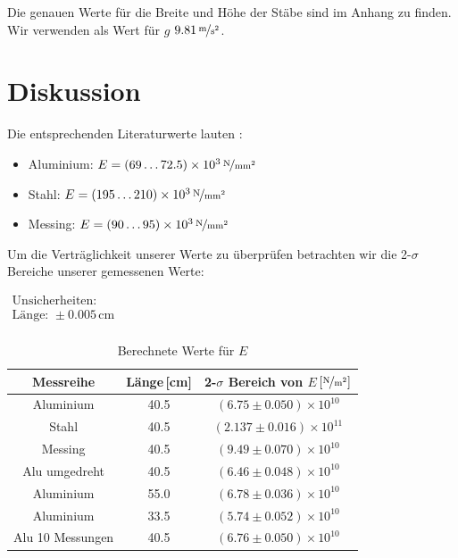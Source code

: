 \documentclass[11pt,a4paper]{article}
\begin{document}
Die genauen Werte f\"ur die Breite und H\"ohe der St\"abe sind im Anhang zu finden. Wir verwenden als Wert f\"ur $g$ $9.81\,\nicefrac{\mathrm{m}}{\mathrm{s}^2}$.

\pagebreak

\section{Diskussion}

Die entsprechenden Literaturwerte lauten \cite{Anleitung}:

\begin{itemize}
\item Aluminium: $E=(69\ldots72.5)\times10^3\,\nicefrac{\mathrm{N}}{\mathrm{mm^2}}$
\item Stahl: $E=(195\ldots210)\times10^3\,\nicefrac{\mathrm{N}}{\mathrm{mm^2}}$
\item Messing: $E=(90\ldots95)\times10^3\,\nicefrac{\mathrm{N}}{\mathrm{mm^2}}$
\end{itemize}

Um die Vertr\"aglichkeit unserer Werte zu \"uberpr\"ufen betrachten wir die 2-$\sigma$ Bereiche unserer gemessenen Werte:

\begin{table}[h]
\centering
\caption{Berechnete Werte f\"ur $E$} \vspace{11pt}
$\begin{array}{l}
\textrm{Unsicherheiten:}\\
\textrm{L\"ange: } \pm 0.005\,\textrm{cm}\\
\end{array}$
\begin{tabular}{ccc}
\toprule
\textrm{Messreihe} & \textrm{L\"ange}\,[\textrm{cm}] & \textrm{2-}$\sigma$\textrm{ Bereich von }$E$\,$\left[\nicefrac{\mathrm{N}}{\mathrm{m^2}}\right]$ \\
\midrule 
\textrm{Aluminium} & 40.5 & $(6.75\pm0.050)\times10^{10}$ \\
\textrm{Stahl} & 40.5 & $(2.137\pm0.016)\times10^{11}$ \\
\textrm{Messing} & 40.5 & $(9.49\pm0.070)\times10^{10}$ \\
\hline
\textrm{Alu umgedreht} & 40.5 & $(6.46\pm0.048)\times10^{10}$ \\
\textrm{Aluminium} & 55.0 & $(6.78\pm0.036)\times10^{10}$ \\ 
\textrm{Aluminium} & 33.5 & $(5.74\pm0.052)\times10^{10}$ \\ 
\textrm{Alu 10 Messungen} & 40.5 & $(6.76\pm0.050)\times10^{10}$ \\ 
\bottomrule
\end{tabular}
\label{Tab:1}
\end{table}
\end{document}
